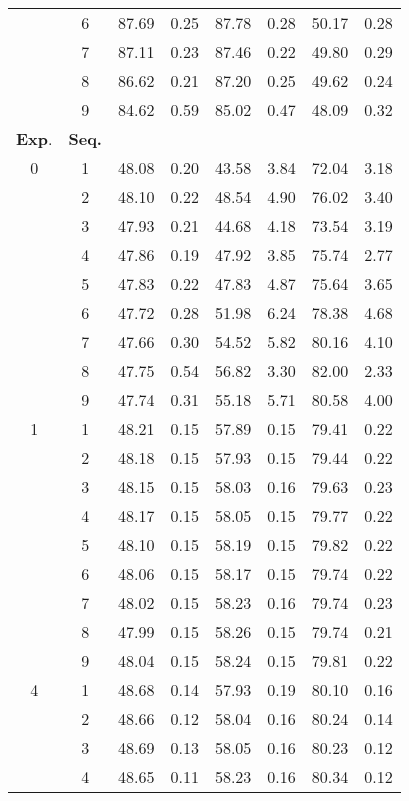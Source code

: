 \begin{table}[htbp]
\begin{center}
\begin{scriptsize}
\begin{tabular}{|c|c|cc|cc|cc|}
		& 6 & 87.69 & 0.25 & 87.78 & 0.28 & 50.17 & 0.28\\
		& 7 & 87.11 & 0.23 & 87.46 & 0.22 & 49.80 & 0.29\\
		& 8 & 86.62 & 0.21 & 87.20 & 0.25 & 49.62 & 0.24\\
		& 9 & 84.62 & 0.59 & 85.02 & 0.47 & 48.09 & 0.32\\
	  \hline
	  \textbf{Exp}. & \textbf{Seq.} & \misd{11}{12} & \sisd{11}{12} & \misd{10}{11} & \sisd{10}{11} & \misd{10}{12} & \sisd{10}{12}\\
	  \hline
	  0  & 1 & 48.08 & 0.20 & 43.58 & 3.84 & 72.04 & 3.18\\
		 & 2 & 48.10 & 0.22 & 48.54 & 4.90 & 76.02 & 3.40\\
		 & 3 & 47.93 & 0.21 & 44.68 & 4.18 & 73.54 & 3.19\\
		 & 4 & 47.86 & 0.19 & 47.92 & 3.85 & 75.74 & 2.77\\
		 & 5 & 47.83 & 0.22 & 47.83 & 4.87 & 75.64 & 3.65\\
		 & 6 & 47.72 & 0.28 & 51.98 & 6.24 & 78.38 & 4.68\\
		 & 7 & 47.66 & 0.30 & 54.52 & 5.82 & 80.16 & 4.10\\
		 & 8 & 47.75 & 0.54 & 56.82 & 3.30 & 82.00 & 2.33\\
		 & 9 & 47.74 & 0.31 & 55.18 & 5.71 & 80.58 & 4.00\\
	  \hline
	  1 & 1 & 48.21 & 0.15 & 57.89 & 0.15 & 79.41 & 0.22\\
		& 2 & 48.18 & 0.15 & 57.93 & 0.15 & 79.44 & 0.22\\
		& 3 & 48.15 & 0.15 & 58.03 & 0.16 & 79.63 & 0.23\\
		& 4 & 48.17 & 0.15 & 58.05 & 0.15 & 79.77 & 0.22\\
		& 5 & 48.10 & 0.15 & 58.19 & 0.15 & 79.82 & 0.22\\
		& 6 & 48.06 & 0.15 & 58.17 & 0.15 & 79.74 & 0.22\\
		& 7 & 48.02 & 0.15 & 58.23 & 0.16 & 79.74 & 0.23\\
		& 8 & 47.99 & 0.15 & 58.26 & 0.15 & 79.74 & 0.21\\
		& 9 & 48.04 & 0.15 & 58.24 & 0.15 & 79.81 & 0.22\\
	  \hline
	  4 & 1 & 48.68 & 0.14 & 57.93 & 0.19 & 80.10 & 0.16\\
		& 2 & 48.66 & 0.12 & 58.04 & 0.16 & 80.24 & 0.14\\
		& 3 & 48.69 & 0.13 & 58.05 & 0.16 & 80.23 & 0.12\\
		& 4 & 48.65 & 0.11 & 58.23 & 0.16 & 80.34 & 0.12\\

\end{tabular}
\end{scriptsize}
\end{center}
\end{table}
